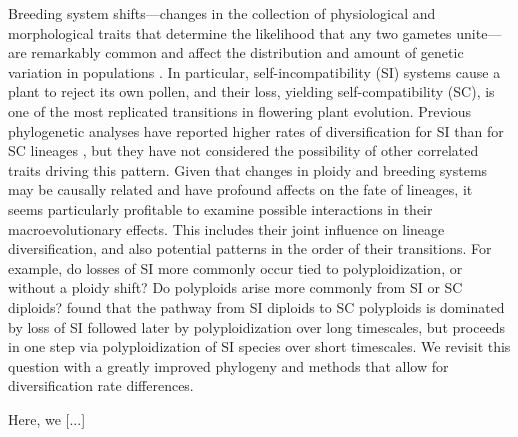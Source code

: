 Breeding system shifts---changes in the collection of physiological and morphological traits that determine the likelihood that any two gametes unite---are remarkably common and affect the distribution and amount of genetic variation in populations \citep{stebbins1974, barrett2013}.
In particular, self-incompatibility (SI) systems cause a plant to reject its own pollen, and their loss, yielding self-compatibility (SC), is one of the most replicated transitions in flowering plant evolution. %
Previous phylogenetic analyses have reported higher rates of diversification for SI than for SC lineages \citep{goldberg_2010, devos2014}, but they have not considered the possibility of other correlated traits driving this pattern.
Given that changes in ploidy and breeding systems may be causally related and have profound affects on the fate of lineages, it seems particularly profitable to examine possible interactions in their macroevolutionary effects.
This includes their joint influence on lineage diversification, and also potential patterns in the order of their transitions.
For example, do losses of SI more commonly occur tied to polyploidization, or without a ploidy shift?
Do polyploids arise more commonly from SI or SC diploids?
 found that the pathway from SI diploids to SC polyploids is dominated by loss of SI followed later by polyploidization over long timescales, but proceeds in one step via polyploidization of SI species over short timescales.
We revisit this question with a greatly improved phylogeny and methods that allow for diversification rate differences. %



Here, we [...]
